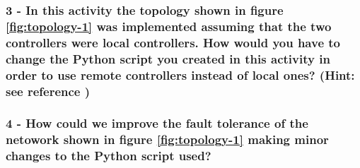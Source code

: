 \hrulefill

\hrulefill

\hrulefill



\subsubsection*{3 - In this activity the topology shown in figure \ref{fig:topology-1}
was implemented assuming that the two controllers were local controllers. How would
you have to change the Python script you created in this activity in order
to use remote controllers instead of local ones? (Hint: see reference \cite{ref-5})}
\hrulefill

\hrulefill

\hrulefill

\hrulefill



\subsubsection*{4 - How could we improve the fault tolerance of the netowork shown
in figure \ref{fig:topology-1} making minor changes to the Python script used?}
\hrulefill

\hrulefill

\hrulefill

\hrulefill




